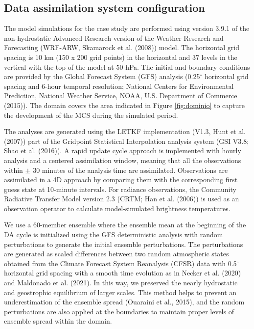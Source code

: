 \documentclass[authoryear,preprint,review,12pt]{elsarticle} %
\begin{document}
\hypertarget{config}{%
\subsection{Data assimilation system configuration}\label{config}}

The model simulations for the case study are performed using version 3.9.1 of the non-hydrostatic Advanced Research version of the Weather Research and Forecasting (WRF-ARW, Skamarock et al. (2008)) model.
The horizontal grid spacing is 10 km (150 x 200 grid points) in the horizontal and 37 levels in the vertical with the top of the model at 50 hPa.
The initial and boundary conditions are provided by the Global Forecast System (GFS) analysis (0.25\(^{\circ}\) horizontal grid spacing and 6-hour temporal resolution; National Centers for Environmental Prediction, National Weather Service, NOAA, U.S. Department of Commerce (2015)).
The domain covers the area indicated in Figure \ref{fig:dominio} to capture the development of the MCS during the simulated period.

The analyses are generated using the LETKF implementation (V1.3, Hunt et al. (2007)) part of the Gridpoint Statistical Interpolation analysis system (GSI V3.8; Shao et al. (2016)).
A rapid update cycle approach is implemented with hourly analysis and a centered assimilation window, meaning that all the observations within \(\pm\) 30 minutes of the analysis time are assimilated.
Observations are assimilated in a 4D approach by comparing them with the corresponding first guess state at 10-minute intervals.
For radiance observations, the Community Radiative Transfer Model version 2.3 (CRTM; Han et al. (2006)) is used as an observation operator to calculate model-simulated brightness temperatures.

We use a 60-member ensemble where the ensemble mean at the beginning of the DA cycle is initialized using the GFS deterministic analysis with random perturbations to generate the initial ensemble perturbations. The perturbations are generated as scaled differences between two random atmospheric states obtained from the Climate Forecast System Reanalysis (CFSR) data with 0.5\(^{\circ}\) horizontal grid spacing with a smooth time evolution as in Necker et al. (2020) and Maldonado et al. (2021). In this way, we preserved the nearly hydrostatic and geostrophic equilibrium of larger scales. This method helps to prevent an underestimation of the ensemble spread (Ouaraini et al., 2015), and the random perturbations are also applied at the boundaries to maintain proper levels of ensemble spread within the domain.
\end{document}
